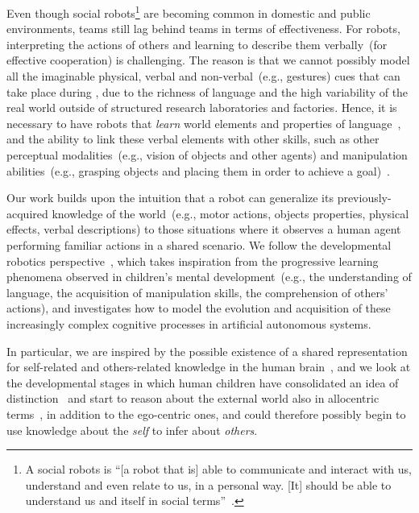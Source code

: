 Even though social robots\footnote{A social robots is ``[a robot that is] able to communicate and interact with us, understand and even relate to us, in a personal way. [It] should be able to understand us and itself in social terms''~\cite{breazeal:2002:dsr}.} are becoming common in domestic and public environments, \hr{} teams still lag behind \hh{} teams in terms of effectiveness.
For robots, interpreting the actions of others and learning to describe them verbally~(for effective cooperation) is challenging.
The reason is that we cannot possibly model all the imaginable physical, verbal and non-verbal~(e.g., gestures) cues that can take place during \hri, due to the richness of language and the high variability of the real world outside of structured research laboratories and factories.
Hence, it is necessary to have robots that \emph{learn} world elements and properties of language~\cite{iwahashi:2007:hri}, and the ability to link these verbal elements with other skills, such as other perceptual modalities~(e.g., vision of objects and other agents) and manipulation abilities~(e.g., grasping objects and placing them in order to achieve a goal)~\cite{steels:2003:trendscogsci}.

Our work builds upon the intuition that a robot can generalize its previously-acquired knowledge of the world~(e.g., motor actions, objects properties, physical effects, verbal descriptions) to those situations where it observes a human agent performing familiar actions in a shared \hr{} scenario.
We follow the developmental robotics perspective~\cite{lungarella:2003:devrobsurvey,cangelosi:2015:devrobbook},
which takes inspiration from the progressive learning phenomena observed in children's mental development~(e.g., the understanding of language, the acquisition of manipulation skills, the comprehension of others' actions), and investigates how to model the evolution and acquisition of these increasingly complex cognitive processes in artificial autonomous systems.

In particular, we are inspired by the possible existence of a shared representation for self-related and others-related knowledge in the human brain~\cite{gallagher:1996:earliest,rizzolatti:2001:nrn,decety:2003:sharedrep}, and we look at the developmental stages in which human children have consolidated an idea of \selfother{} distinction~\cite{symons:2004:mental} and start to reason about the external world also in allocentric terms~\cite{ribordy:2013:development}, in addition to the ego-centric ones, and could therefore possibly begin to use knowledge about the \emph{self} to infer about \emph{others}.


